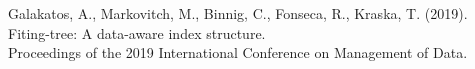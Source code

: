 \documentclass[usenames,dvipsnames, 18pt, compress, aspectratio=169]{beamer}
\begin{document}
\begin{frame}[fragile]{}
\begin{center}
\begin{overprint}[14cm]

    \end{overprint}

    \linespread{0.5}
    \vspace{0.5cm}
    \color{black}\fontsize{6pt}{0}\selectfont
        Galakatos, A., Markovitch, M., Binnig, C., Fonseca, R., Kraska, T.
        (2019). Fiting-tree: A data-aware index structure. \\
        Proceedings of the 2019 International Conference on Management of Data.
    \linespread{1.5}

    \end{center}
\end{frame}
\end{document}
